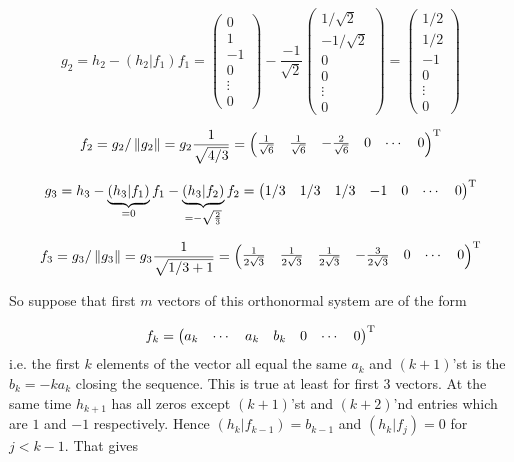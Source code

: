 \documentclass{article}
\begin{document}
    $$g_2 = h_2 - \left(h_2|f_1\right)f_1 =
\begin{pmatrix}0\\ 1\\ -1 \\ 0 \\ \vdots \\ 0 \end{pmatrix}
    -
\frac{-1}{\sqrt2} \begin{pmatrix} 1/\sqrt2 \\ - 1/\sqrt2 \\ 0 \\ 0 \\ \vdots \\ 0 \end{pmatrix}
    = \begin{pmatrix} 1/2 \\ 1/2 \\ -1 \\ 0 \\ \vdots \\ 0 \end{pmatrix}$$

        $$f_2 = g_2/\left\|{g_2}\right\| =
g_2 \frac{1}{\sqrt{4/3}} =
\begin{pmatrix} \frac1{\sqrt6} & \frac1{\sqrt6} & - \frac2{\sqrt6} & 0 & \cdots & 0 \end{pmatrix}^{\mathrm{T}}$$

    $$g_3 =
h_3 - \underbrace{\left(h_3|f_1\right)}_{=0}f_1
    - \underbrace{\left(h_3|f_2\right)}_{=-\sqrt{\frac23}}f_2
= \begin{pmatrix} 1/3 & 1/3 & 1/3 & -1 & 0 & \cdots & 0 \end{pmatrix}^{\mathrm{T}}$$

    $$f_3 = g_3 / \left\|{g_3}\right\| = g_3 \frac{1}{\sqrt{1/3 + 1}} =
\begin{pmatrix}
    \frac{1}{2\sqrt3} & \frac{1}{2\sqrt3} &
    \frac{1}{2\sqrt3} & - \frac{3}{2\sqrt3} &
    0 & \cdots & 0
\end{pmatrix}^{\mathrm{T}}$$

So suppose that first $m$ vectors of this orthonormal system
are of the form

$$ f_k =
\begin{pmatrix}
    a_k & \cdots & a_k & b_k & 0 & \cdots & 0
\end{pmatrix}^{\mathrm{T}}$$
i.e. the first $k$ elements of the vector all equal the same $a_k$
and $(k+1)$'st is the $b_k = -ka_k$ closing the sequence.
This is true at least for first 3 vectors.
At the same time $h_{k+1}$ has all zeros
except $(k+1)$'st and $(k+2)$'nd entries which are $1$ and $-1$ respectively.
Hence $\left(h_k|f_{k-1}\right) = b_{k-1}$ and $\left(h_k|f_j\right) = 0$ for $j < k-1$.
That gives
\end{document}
